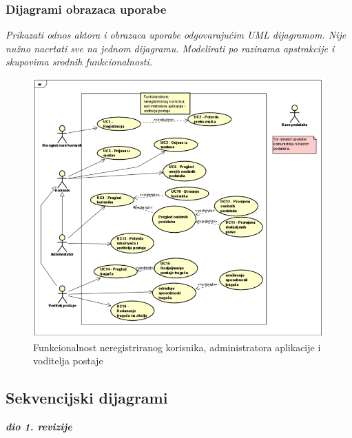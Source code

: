 					
				\subsubsection{Dijagrami obrazaca uporabe}
					
					\textit{Prikazati odnos aktora i obrazaca uporabe odgovarajućim UML dijagramom. Nije nužno nacrtati sve na jednom dijagramu. Modelirati po razinama apstrakcije i skupovima srodnih funkcionalnosti.}
				
					\begin{figure}[H]
						\includegraphics[scale=1]{slike/Funkcionalnost neregistriranog korisnika, administratora aplikacije i voditelja postaje.png} %
						\centering
						\caption{Funkcionalnost neregistriranog korisnika, administratora aplikacije i voditelja postaje}
						\label{fig:Funkcionalnost neregistriranog korisnika, administratora aplikacije i voditelja postaje}
					\end{figure}
				
				
					\eject		
				
			\subsection{Sekvencijski dijagrami}
				
				\textbf{\textit{dio 1. revizije}}\\
				
